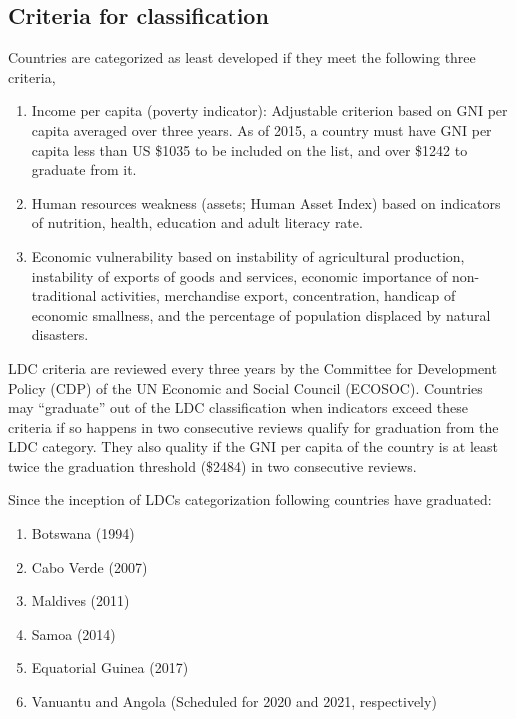 \documentclass[
  openany]{book}
\providecommand{\tightlist}{%
  \setlength{\itemsep}{0pt}\setlength{\parskip}{0pt}}
\begin{document}
\hypertarget{criteria-for-classification}{%
\subsection{Criteria for classification}\label{criteria-for-classification}}

Countries are categorized as least developed if they meet the following three criteria,

\begin{enumerate}
\def\labelenumi{\arabic{enumi}.}
\tightlist
\item
  Income per capita (poverty indicator): Adjustable criterion based on GNI per capita averaged over three years. As of 2015, a country must have GNI per capita less than US \$1035 to be included on the list, and over \$1242 to graduate from it.
\item
  Human resources weakness (assets; Human Asset Index) based on indicators of nutrition, health, education and adult literacy rate.
\item
  Economic vulnerability based on instability of agricultural production, instability of exports of goods and services, economic importance of non-traditional activities, merchandise export, concentration, handicap of economic smallness, and the percentage of population displaced by natural disasters.
\end{enumerate}

LDC criteria are reviewed every three years by the Committee for Development Policy (CDP) of the UN Economic and Social Council (ECOSOC). Countries may ``graduate'' out of the LDC classification when indicators exceed these criteria if so happens in two consecutive reviews qualify for graduation from the LDC category. They also quality if the GNI per capita of the country is at least twice the graduation threshold (\$2484) in two consecutive reviews.

Since the inception of LDCs categorization following countries have graduated:

\begin{enumerate}
\def\labelenumi{\arabic{enumi}.}
\tightlist
\item
  Botswana (1994)
\item
  Cabo Verde (2007)
\item
  Maldives (2011)
\item
  Samoa (2014)
\item
  Equatorial Guinea (2017)
\item
  Vanuantu and Angola (Scheduled for 2020 and 2021, respectively)
\end{enumerate}
\end{document}
